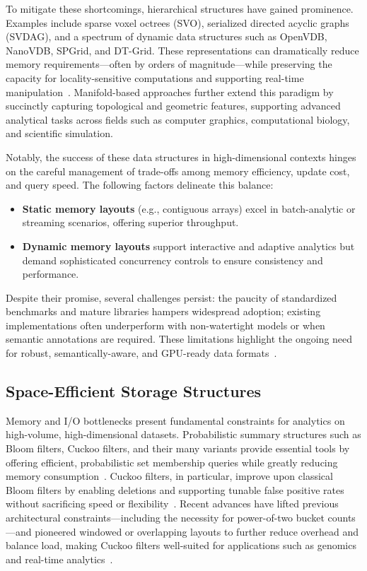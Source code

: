 \documentclass[11pt]{article}
\begin{document}
To mitigate these shortcomings, hierarchical structures have gained prominence. Examples include sparse voxel octrees (SVO), serialized directed acyclic graphs (SVDAG), and a spectrum of dynamic data structures such as OpenVDB, NanoVDB, SPGrid, and DT-Grid. These representations can dramatically reduce memory requirements—often by orders of magnitude—while preserving the capacity for locality-sensitive computations and supporting real-time manipulation~\cite{ref86}. Manifold-based approaches further extend this paradigm by succinctly capturing topological and geometric features, supporting advanced analytical tasks across fields such as computer graphics, computational biology, and scientific simulation.

Notably, the success of these data structures in high-dimensional contexts hinges on the careful management of trade-offs among memory efficiency, update cost, and query speed. The following factors delineate this balance:
\begin{itemize}
    \item \textbf{Static memory layouts} (e.g., contiguous arrays) excel in batch-analytic or streaming scenarios, offering superior throughput.
    \item \textbf{Dynamic memory layouts} support interactive and adaptive analytics but demand sophisticated concurrency controls to ensure consistency and performance.
\end{itemize}
Despite their promise, several challenges persist: the paucity of standardized benchmarks and mature libraries hampers widespread adoption; existing implementations often underperform with non-watertight models or when semantic annotations are required. These limitations highlight the ongoing need for robust, semantically-aware, and GPU-ready data formats~\cite{ref86}.

\subsection{Space-Efficient Storage Structures}

Memory and I/O bottlenecks present fundamental constraints for analytics on high-volume, high-dimensional datasets. Probabilistic summary structures such as Bloom filters, Cuckoo filters, and their many variants provide essential tools by offering efficient, probabilistic set membership queries while greatly reducing memory consumption~\cite{ref80, ref81, ref82, ref87, ref106, ref108, ref109, ref118}. Cuckoo filters, in particular, improve upon classical Bloom filters by enabling deletions and supporting tunable false positive rates without sacrificing speed or flexibility~\cite{ref81, ref82}. Recent advances have lifted previous architectural constraints—including the necessity for power-of-two bucket counts—and pioneered windowed or overlapping layouts to further reduce overhead and balance load, making Cuckoo filters well-suited for applications such as genomics and real-time analytics~\cite{ref81}.
\end{document}
